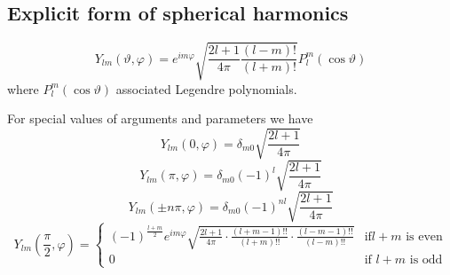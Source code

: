 \subsection{Explicit form of spherical harmonics}
\begin{equation}
Y_{lm}(\vartheta,\varphi)=e^{im\varphi}\sqrt{\frac{2l+1}{4\pi}\frac{(l-m)!}{(l+m)!}}P_l^m(\cos \vartheta)
\end{equation}
where $P_l^m(\cos \vartheta)$ associated Legendre polynomials.
\par{For special values of arguments and parameters we have}
\begin{equation}
Y_{lm}(0,\varphi)=\delta_{m0}\sqrt{\frac{2l+1}{4\pi}}
\end{equation}
\begin{equation}
Y_{lm}(\pi,\varphi)=\delta_{m0}(-1)^l\sqrt{\frac{2l+1}{4\pi}}
\end{equation}
\begin{equation}
Y_{lm}(\pm n\pi,\varphi)=\delta_{m0}(-1)^{nl}\sqrt{\frac{2l+1}{4\pi}}
\end{equation}
\begin{equation}
Y_{lm}(\frac{\pi}{2},\varphi)=\left\{\begin{array}{lc}
(-1)^{\frac{l+m}{2}}e^{im\varphi}\sqrt{\frac{2l+1}{4\pi}\cdot
  \frac{(l+m-1)!!}{(l+m)!!}\cdot \frac{(l-m-1)!!}{(l-m)!!}} & \text{if
}l+m\text{ is even}\\
0 & \text{if }l+m\text{ is odd}
\end{array}
\right.
\end{equation}
